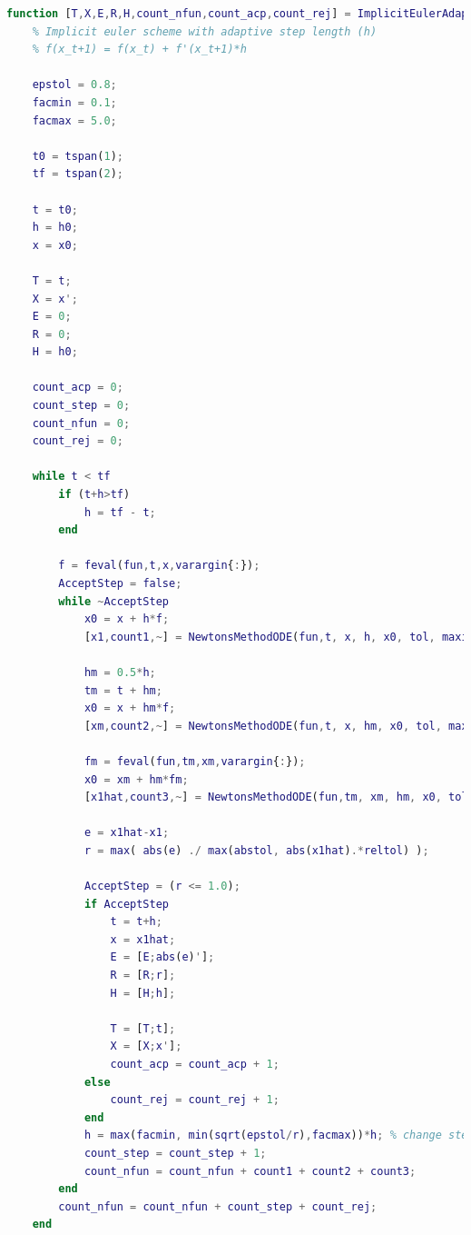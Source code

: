 \begin{lstlisting}[language=Matlab,caption=Implicit Euler with adaptive step size.,label=lst3:im_euler_adap]
function [T,X,E,R,H,count_nfun,count_acp,count_rej] = ImplicitEulerAdaptiveStep(fun,tspan,x0,h0,abstol,reltol,varargin)
    % Implicit euler scheme with adaptive step length (h)
    % f(x_t+1) = f(x_t) + f'(x_t+1)*h
    
    epstol = 0.8; 
    facmin = 0.1; 
    facmax = 5.0; 

    t0 = tspan(1); 
    tf = tspan(2); 

    t = t0; 
    h = h0; 
    x = x0; 

    T = t; 
    X = x'; 
    E = 0;
    R = 0;
    H = h0; 
    
    count_acp = 0; 
    count_step = 0; 
    count_nfun = 0; 
    count_rej = 0; 

    while t < tf 
        if (t+h>tf)
            h = tf - t; 
        end 

        f = feval(fun,t,x,varargin{:});
        AcceptStep = false;
        while ~AcceptStep
            x0 = x + h*f; 
            [x1,count1,~] = NewtonsMethodODE(fun,t, x, h, x0, tol, maxit,varargin{:});

            hm = 0.5*h; 
            tm = t + hm; 
            x0 = x + hm*f; 
            [xm,count2,~] = NewtonsMethodODE(fun,t, x, hm, x0, tol, maxit,varargin{:});

            fm = feval(fun,tm,xm,varargin{:});
            x0 = xm + hm*fm; 
            [x1hat,count3,~] = NewtonsMethodODE(fun,tm, xm, hm, x0, tol, maxit,varargin{:});

            e = x1hat-x1; 
            r = max( abs(e) ./ max(abstol, abs(x1hat).*reltol) ); 

            AcceptStep = (r <= 1.0);
            if AcceptStep
                t = t+h; 
                x = x1hat; 
                E = [E;abs(e)'];
                R = [R;r];
                H = [H;h];

                T = [T;t];
                X = [X;x'];
                count_acp = count_acp + 1;
            else 
                count_rej = count_rej + 1; 
            end
            h = max(facmin, min(sqrt(epstol/r),facmax))*h; % change step size
            count_step = count_step + 1;
            count_nfun = count_nfun + count1 + count2 + count3;
        end 
        count_nfun = count_nfun + count_step + count_rej;
    end 
\end{lstlisting}

